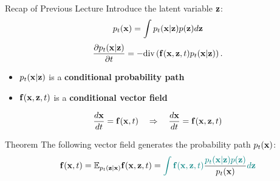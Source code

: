 \documentclass{beamer}
\begin{document}
\begin{frame}{Recap of Previous Lecture}
	\vspace{-0.3cm}
	Introduce the latent variable $\mathbf{z}$:
	\[
		p_t(\mathbf{x}) = \int p_t(\mathbf{x} | \mathbf{z}) p(\mathbf{z}) d \mathbf{z} 
	\]
	\vspace{-0.5cm}
	\[
		\frac{\partial p_t(\mathbf{x} | \mathbf{z})}{\partial t} = - \text{div}\left(\mathbf{f}(\mathbf{x}, \mathbf{z}, t) p_t(\mathbf{x} | \mathbf{z})\right).
	\]
	\vspace{-0.3cm}
	\begin{itemize}
		\item $p_t(\mathbf{x} | \mathbf{z})$ is a \textbf{conditional probability path}
		\item $\mathbf{f}(\mathbf{x}, \mathbf{z}, t)$ is a \textbf{conditional vector field}
	\end{itemize}
	\[
		\frac{d\mathbf{x}}{dt} = \mathbf{f}(\mathbf{x}, t) \quad \Rightarrow \quad \frac{d\mathbf{x}}{dt} = \mathbf{f}(\mathbf{x}, \mathbf{z}, t)
	\]
	\vspace{-0.5cm}
	\begin{block}{Theorem}
		The following vector field generates the probability path $p_t(\mathbf{x})$:
		\vspace{-0.2cm}
		\[
			\mathbf{f}(\mathbf{x}, t) = \mathbb{E}_{p_t(\mathbf{z} | \mathbf{x})} \mathbf{f}(\mathbf{x}, \mathbf{z}, t)  = {\color{teal}\int \mathbf{f}(\mathbf{x}, \mathbf{z}, t)} \frac{\color{teal}p_t(\mathbf{x} | \mathbf{z}) p(\mathbf{z})}{p_t(\mathbf{x})} {\color{teal}d \mathbf{z}}
		\]
		\vspace{-0.5cm}
	\end{block}
\end{frame}
\end{document}
